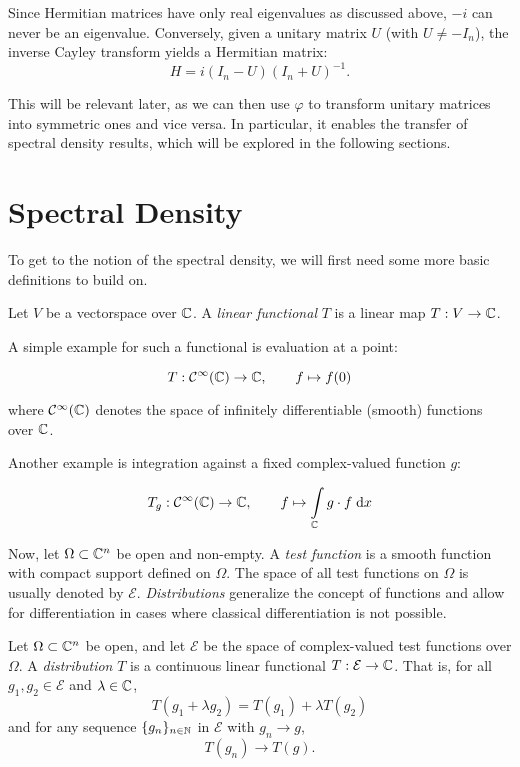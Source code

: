 Since Hermitian matrices have only real eigenvalues as discussed above, $-i$ can never be an eigenvalue.
Conversely, given a unitary matrix $U$ (with $U \neq -I_n$),
the inverse Cayley transform yields a Hermitian matrix:
\[
H = i (I_n - U)(I_n + U)^{-1}.
\]

This will be relevant later, as we can then use $\varphi$ to transform unitary matrices into symmetric ones and vice versa.
In particular, it enables the transfer of spectral density results,
which will be explored in the following sections.

\section{Spectral Density}

To get to the notion of the spectral density,
we will first need some more basic definitions to build on.

\begin{definition}
    Let $V$ be a vectorspace over $\mathbb{C}$.
    A \emph{linear functional} $T$ is a linear map $T: V \to \mathbb{C}$.
\end{definition}

A simple example for such a functional is evaluation at a point:

\begin{equation} \label{eq:functional_example_simple}
    T: \mathcal{C}^{\infty}(\mathbb{C}) \to \mathbb{C}, \qquad f \mapsto f(0)
\end{equation}

where $\mathcal{C}^{\infty}(\mathbb{C})$ denotes the space of infinitely differentiable (smooth) functions over $\mathbb{C}$.

Another example is integration against a fixed complex-valued function $g$:

\begin{equation} \label{eq:functional_example_integral}
    T_g: \mathcal{C}^{\infty}(\mathbb{C}) \to \mathbb{C}, \qquad f \mapsto \int\limits_{\mathbb{C}} g \cdot f \;\mathrm{d}x
\end{equation}

Now, let $\Omega \subset \mathbb{C}^n$ be open and non-empty.
A \emph{test function} is a smooth function with compact support defined on $\Omega$.
The space of all test functions on $\Omega$ is usually denoted by $\mathcal{E}$.
\emph{Distributions} generalize the concept of functions
and allow for differentiation in cases where classical differentiation is not possible.

\begin{definition}[Distribution] \label{def:Distribution}
    Let $\Omega \subset \mathbb{C}^n$ be open,
    and let $\mathcal{E}$ be the space of complex-valued test functions over $\Omega$.
    A \emph{distribution} $T$ is a continuous linear functional $T: \mathcal{E} \to \mathbb{C}$.
    That is, for all $g_1, g_2 \in \mathcal{E}$ and $\lambda \in \mathbb{C}$,
    \[
    T(g_1 + \lambda g_2) = T(g_1) + \lambda T(g_2)
    \]
    and for any sequence $\{g_n\}_{n \in \mathbb{N}}$ in $\mathcal{E}$ with $g_n \to g$,
    \[
    T(g_n) \to T(g).
    \]
\end{definition}

